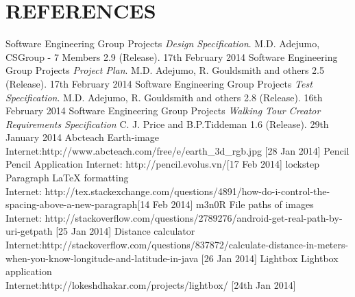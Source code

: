 \documentclass[12pt]{article}
\begin{document}
\section{REFERENCES}
\begin{thebibliography}{0}
Software Engineering Group Projects
\emph{ Design Specification}.
M.D. Adejumo, CSGroup - 7 Members 2.9
(Release). 17th February 2014
Software Engineering Group Projects
\emph{Project Plan}.
M.D. Adejumo, R. Gouldsmith and others 2.5
(Release). 17th February 2014
Software Engineering Group Projects
\emph{ Test Specification}.
M.D. Adejumo, R. Gouldsmith and others 2.8
(Release). 16th February 2014
Software Engineering Group Projects
\emph{Walking Tour Creator Requirements Specification}
C. J. Price and B.P.Tiddeman 1.6 (Release). 29th January 2014
Abcteach Earth-image Internet:http://www.abcteach.com/free/e/earth\_3d\_rgb.jpg [28 Jan 2014]
Pencil Pencil Application Internet: http://pencil.evolus.vn/[17 Feb 2014]
lockstep Paragraph LaTeX formatting~\\Internet: http://tex.stackexchange.com/questions/4891/how-do-i-control-the-spacing-above-a-new-paragraph[14 Feb 2014]
m3n0R File paths of images \\ Internet: http://stackoverflow.com/questions/2789276/android-get-real-path-by-uri-getpath [25 Jan 2014]
Distance calculator ~\\ Internet:http://stackoverflow.com/questions/837872/calculate-distance-in-meters-when-you-know-longitude-and-latitude-in-java [26 Jan 2014]
Lightbox Lightbox application~\\ Internet:http://lokeshdhakar.com/projects/lightbox/ [24th Jan 2014]
\end{thebibliography}
\newpage
\end{document}
